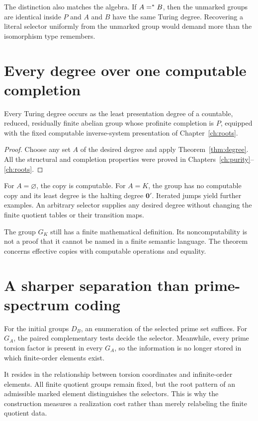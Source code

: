 The distinction also matches the algebra. If $A=^{*} B$, then the unmarked groups are identical inside $P$ and $A$ and $B$ have the same Turing degree. Recovering a literal selector uniformly from the unmarked group would demand more than the isomorphism type remembers.

\section{Every degree over one computable completion}
\begin{corollary}
\label{thm:alldegrees}
Every Turing degree occurs as the least presentation degree of a countable, reduced, residually finite abelian group whose profinite completion is $P$, equipped with the fixed computable inverse-system presentation of Chapter~\ref{ch:roots}.
\end{corollary}
\begin{proof}
Choose any set $A$ of the desired degree and apply Theorem~\ref{thm:degree}. All the structural and completion properties were proved in Chapters~\ref{ch:purity}--\ref{ch:roots}.
\end{proof}
For $A=\varnothing$, the copy is computable. For $A=K$, the group has no computable copy and its least degree is the halting degree $\mathbf 0'$. Iterated jumps yield further examples. An arbitrary selector supplies any desired degree without changing the finite quotient tables or their transition maps.

The group $G_K$ still has a finite mathematical definition. Its noncomputability is not a proof that it cannot be named in a finite semantic language. The theorem concerns effective copies with computable operations and equality.

\section{A sharper separation than prime-spectrum coding}
For the initial groups $D_B$, an enumeration of the selected prime set suffices. For $G_A$, the paired complementary tests decide the selector. Meanwhile, every prime torsion factor is present in every $G_A$, so the information is no longer stored in which finite-order elements exist.

It resides in the relationship between torsion coordinates and infinite-order elements. All finite quotient groups remain fixed, but the root pattern of an admissible marked element distinguishes the selectors. This is why the construction measures a realization cost rather than merely relabeling the finite quotient data.
